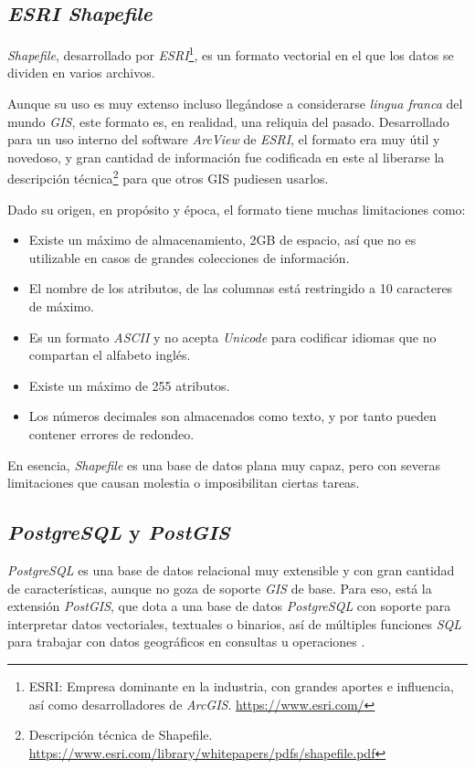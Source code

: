 \subsection{\textit{ESRI Shapefile}}
	\textit{Shapefile}, desarrollado por \textit{ESRI}\footnote{ESRI: Empresa dominante en la industria, con grandes aportes e influencia, así como desarrolladores de \textit{ArcGIS}. \url{https://www.esri.com/}}, es un formato vectorial en el que los datos se dividen en varios archivos.
	
	Aunque su uso es muy extenso incluso llegándose a considerarse \textit{lingua franca} del mundo \textit{GIS}, este formato es, en realidad, una reliquia del pasado. Desarrollado para un uso interno del software \textit{ArcView} de \textit{ESRI}, el formato era muy útil y novedoso, y gran cantidad de información fue codificada en este al liberarse la descripción técnica\footnote{Descripción técnica de Shapefile. \url{https://www.esri.com/library/whitepapers/pdfs/shapefile.pdf}} para que otros GIS pudiesen usarlos.
	
	Dado su origen, en propósito y época, el formato tiene muchas limitaciones como:
	
	\begin{itemize}
		\item Existe un máximo de almacenamiento, 2GB de espacio, así que no es utilizable en casos de grandes colecciones de información.
		\item El nombre de los atributos, de las columnas está restringido a 10 caracteres de máximo.
		\item Es un formato \textit{ASCII} y no acepta \textit{Unicode} para codificar idiomas que no compartan el alfabeto inglés.
		\item Existe un máximo de 255 atributos.
		\item Los números decimales son almacenados como texto, y por tanto pueden contener errores de redondeo.
	\end{itemize}

	En esencia, \textit{Shapefile} es una base de datos plana muy capaz, pero con severas limitaciones que causan molestia o imposibilitan ciertas tareas.

\subsection{\textit{PostgreSQL} y \textit{PostGIS}}
	\textit{PostgreSQL} es una base de datos relacional muy extensible y con gran cantidad de características, aunque no goza de soporte \textit{GIS} de base. Para eso, está la extensión \textit{PostGIS}, que dota a una base de datos \textit{PostgreSQL} con soporte para interpretar datos vectoriales, textuales o binarios, así de múltiples funciones \textit{SQL} para trabajar con datos geográficos en consultas u operaciones \autocite[6-10]{obehsu}.
	
